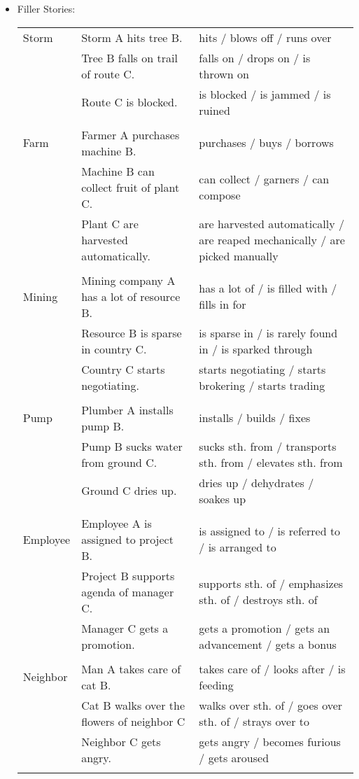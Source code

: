 \begin{itemize}
\begin{longtable}{p{}p{}p{}}
\end{longtable}
\item \normalsize Filler Stories:
\scriptsize
\begin{longtable}{p{}p{}p{}}
Storm & Storm A hits tree B. & hits / blows off / runs over \\   & Tree B falls on trail of route C. & falls on / drops on / is thrown on \\   & Route C is blocked. & is blocked / is jammed / is ruined \\  & & \\ Farm & Farmer A purchases machine B. & purchases / buys / borrows \\   & Machine B can collect fruit of plant C. & can collect / garners / can compose \\   & Plant C are harvested automatically. & are harvested automatically / are reaped mechanically / are picked manually \\  & & \\ Mining & Mining company A has a lot of resource B. & has a lot of / is filled with / fills in for \\   & Resource B is sparse in country C. & is sparse in / is rarely found in / is sparked through \\   & Country C starts negotiating. & starts negotiating / starts brokering / starts trading \\  & & \\ Pump & Plumber A installs pump B. & installs / builds / fixes \\   & Pump B sucks water from ground C. & sucks sth. from / transports sth. from / elevates sth. from \\   & Ground C dries up. & dries up / dehydrates / soakes up \\  & & \\ Employee & Employee A is assigned to project B. & is assigned to / is referred to / is arranged to \\   & Project B supports agenda of manager C. & supports sth. of / emphasizes sth. of / destroys sth. of \\   & Manager C gets a promotion. & gets a promotion / gets an advancement / gets a bonus \\  & & \\ Neighbor & Man A takes care of cat B. & takes care of / looks after / is feeding \\   & Cat B walks over the flowers of neighbor C & walks over sth. of / goes over sth. of / strays over to \\   & Neighbor C gets angry. & gets angry / becomes furious / gets aroused \\  & & \\

\end{longtable}
\end{itemize}
